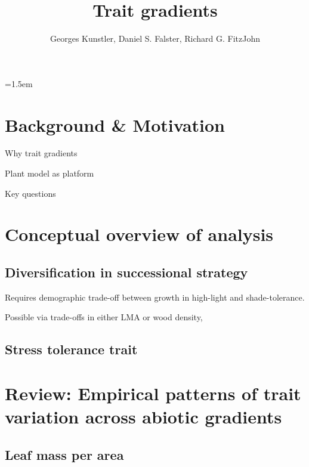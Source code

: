 \documentclass[a4paper,11pt]{article}
\title{Trait gradients}
\author{ Georges Kunstler, Daniel S. Falster, Richard G. FitzJohn}
\date{}
\affiliation{Department of Biological Sciences, Macquarie University,
  Sydney, Australia}
\begin{document}
\mstitleshort
\parindent=1.5em
\addtolength{\parskip}{.3em}


\section{Background \& Motivation}

Why trait gradients

Plant model as platform \citep{Falster-2016}

Key questions

\section{Conceptual overview of analysis}

\subsection{Diversification in successional strategy}

Requires demographic trade-off between growth in high-light and shade-tolerance.

Possible via trade-offs in either LMA or wood density,

\subsection{Stress tolerance trait}


\section{Review: Empirical patterns of trait variation across abiotic
gradients}


\subsection{Leaf mass per area}
\end{document}
